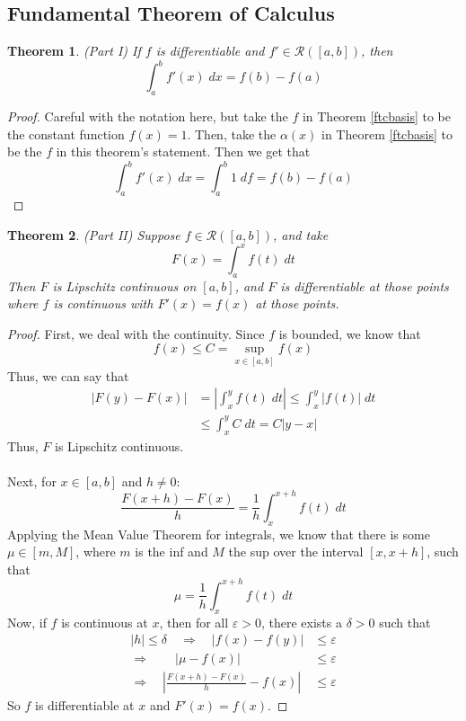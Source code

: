 \documentclass[12pt]{article}
\theoremstyle{plain}
\newtheorem{thm}{Theorem}[subsection]
\theoremstyle{definition}
\theoremstyle{remark}
\begin{document}
\newpage
\subsection{Fundamental Theorem of Calculus}

\begin{thm} \emph{(Part I)}
\label{ftc1}
If $f$ is differentiable and $f'\in\mathscr{R}([a,b])$, then 
    \[ \int^b_a f'(x)\;dx = f(b) - f(a) \]
\end{thm}
\begin{proof}
Careful with the notation here, but take the $f$ in Theorem \ref{ftcbasis} to be the constant function $f(x) =1$. Then, take the $\alpha(x)$ in Theorem \ref{ftcbasis} to be the $f$ in this theorem's statement. Then we get that
\[ \int^b_a f'(x) \;dx = \int^b_a 1 \;df = f(b) - f(a) \]
\end{proof}

\begin{thm} \emph{(Part II)}
\label{ftc2}
Suppose $f\in\mathscr{R}([a,b])$, and take 
    \[ F(x) = \int^x_a f(t)\;dt \]
Then $F$ is Lipschitz continuous on $[a,b]$, and $F$ is differentiable at those points where $f$ is continuous with $F'(x) = f(x)$ at those points.
\end{thm}
\begin{proof}
First, we deal with the continuity. Since $f$ is bounded, we know that 
    \[ 
        f(x) \leq C = \sup_{x\in[a,b]} f(x)
    \]
Thus, we can say that
\begin{align*}
    |F(y) - F(x)| &= \left\lvert \int^y_x f(t)\;dt \right\rvert
        \leq \int^y_x |f(t)|\;dt \\
    &\leq \int^y_x C\;dt = C|y-x| 
\end{align*}
Thus, $F$ is Lipschitz continuous.
\\
\\
Next, for $x\in[a,b]$ and $h\neq 0$:
\[ 
    \frac{F(x+h)-F(x)}{h} = \frac{1}{h}\int^{x+h}_x f(t)\;dt
\]
Applying the Mean Value Theorem for integrals, we know that there is some $\mu \in [m, M]$, where $m$ is the inf and $M$ the sup over the interval $[x,x+h]$, such that 
    \[ \mu = \frac{1}{h}\int^{x+h}_x f(t)\;dt \]
Now, if $f$ is continuous at $x$, then for all $\varepsilon>0$, there exists a $\delta>0$ such that 
\begin{align*}
    |h| \leq \delta \quad \Rightarrow \quad |f(x) - f(y)|
        &\leq\varepsilon \\
    \Rightarrow \qquad |\mu - f(x)|&\leq\varepsilon \\
    \Rightarrow \quad | \frac{F(x+h)-F(x)}{h}- f(x)|
        &\leq\varepsilon 
\end{align*}
So $f$ is differentiable at $x$ and $F'(x)=f(x)$.
\end{proof}
\end{document}
